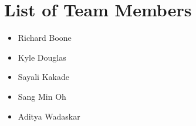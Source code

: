 \section*{List of Team Members}

\begin{itemize}
	\item Richard Boone\vspace{-4pt}
	\item Kyle Douglas\vspace{-4pt}
	\item Sayali Kakade\vspace{-4pt}
	\item Sang Min Oh\vspace{-4pt}
	\item Aditya Wadaskar
\end{itemize}

